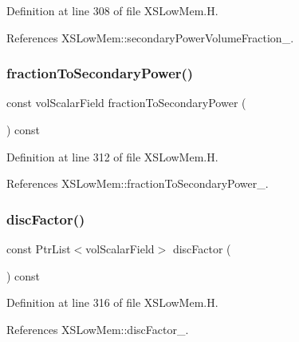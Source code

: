Definition at line 308 of file X\+S\+Low\+Mem.\+H.



References X\+S\+Low\+Mem\+::secondary\+Power\+Volume\+Fraction\+\_\+.

\mbox{\label{classFoam_1_1XSLowMem_aa8387c8a487d8285a32ef61af121e35e}} 
\subsubsection{\texorpdfstring{fraction\+To\+Secondary\+Power()}{fractionToSecondaryPower()}}
{\footnotesize\ttfamily const vol\+Scalar\+Field fraction\+To\+Secondary\+Power (\begin{DoxyParamCaption}{ }\end{DoxyParamCaption}) const\hspace{0.3cm}{\ttfamily [inline]}}



Definition at line 312 of file X\+S\+Low\+Mem.\+H.



References X\+S\+Low\+Mem\+::fraction\+To\+Secondary\+Power\+\_\+.

\mbox{\label{classFoam_1_1XSLowMem_a37492f221b3e42a24a81a6defba591fc}} 
\subsubsection{\texorpdfstring{disc\+Factor()}{discFactor()}}
{\footnotesize\ttfamily const Ptr\+List$<$vol\+Scalar\+Field$>$ disc\+Factor (\begin{DoxyParamCaption}{ }\end{DoxyParamCaption}) const\hspace{0.3cm}{\ttfamily [inline]}}



Definition at line 316 of file X\+S\+Low\+Mem.\+H.



References X\+S\+Low\+Mem\+::disc\+Factor\+\_\+.

